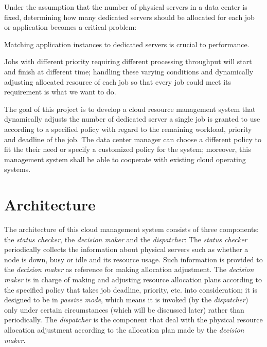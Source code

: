 \documentclass[11pt]{article}
\begin{document}
Under the assumption that the number of physical servers in a data
center is fixed, determining how many dedicated servers should be
allocated for each job or application becomes a critical problem:

Matching application instances to dedicated servers is crucial to
performance.

Jobs with different priority requiring different processing throughput
will start and finish at different time; handling these varying
conditions and dynamically adjusting allocated resource of each job so
that every job could meet its requirement is what we want to do.

The goal of this project is to develop a cloud resource management
system that dynamically adjusts the number of dedicated server a
single job is granted to use according to a specified policy with
regard to the remaining workload, priority and deadline of the
job. The data center manager can choose a different policy to fit the
their need or specify a customized policy for the system; moreover,
this management system shall be able to cooperate with existing cloud
operating systems.


\section{Architecture}


The architecture of this cloud management system consists of three
components: the \emph{status checker}, the \emph{decision maker} and the
\emph{dispatcher}:  The \emph{status checker} periodically collects the
information about physical servers such as whether a node is down, busy
or idle and its resource usage.  Such information is provided to the
\emph{decision maker} as reference for making allocation adjustment.
The \emph{decision maker} is in charge of making and adjusting resource
allocation plans according to the specified policy that takes job
deadline, priority, etc. into consideration; it is designed to be in
\emph{passive mode}, which means it is invoked (by the
\emph{dispatcher}) only under certain circumstances (which will be
discussed later) rather than periodically.  The \emph{dispatcher} is the
component that deal with the physical resource allocation adjustment
according to the allocation plan made by the \emph{decision maker}.
\end{document}
